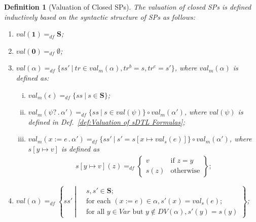 \documentclass{fcs}
\newtheorem{mydef}{Definition}[section]
\newcommand{\bff}[1]{\mathbf{#1}}
\newcommand{\sig}[0]{\varsigma}
\newcommand{\noth}[0]{\mathbf{1}}
\newcommand{\halt}[0]{\mathbf{0}}
\newcommand{\true}[0]{\mathit{tt}}
\newcommand{\false}[0]{\mathit{ff}}
\newcommand{\Var}[0]{\mathit{Var}}
\newcommand{\val}[0]{\mathit{val}}
\newcommand{\dVar}[0]{\mathit{DV}} %
\DeclareMathOperator{\nex}{.}
\newcommand{\mval}[0]{\mathit{val}_m}
\newcommand{\dddef}[0]{=_{df}}
\begin{document}
\begin{mydef}[Valuation of Closed SPs]
	\label{def:Valuation of Closed SPs}
	The valuation of closed SPs is defined inductively based on the syntactic structure of SPs as follows:
	\begin{enumerate}
		\item $\val(\noth)\dddef \bff{S}$;
		\item $\val(\halt)\dddef \emptyset$;
		\item $\val(\alpha)\dddef \{ss'\ |\ tr\in \mval(\alpha), tr^b = s, tr^e = s'\}$, where $\mval(\alpha)$ is defined as:
		\begin{enumerate}[(i)]
		    \item $\mval(\epsilon)\dddef \{ss\ |\ s\in \bff{S}\}$;
		    \item $\mval(\psi?\nex \alpha')\dddef \{ss\ |\ s\in \val(\psi)\}\circ \mval(\alpha')$, where $\val(\psi)$ is defined in Def.~\ref{def:Valuation of sDTL Formulas};
		    \item $\mval(x:=e\nex \alpha')\dddef \{ss'\ |\ s' = s[x\mapsto \val_s(e)]\}\circ \mval(\alpha')$, where $s[y\mapsto v]$ is defined as
            $$
            \begin{aligned}
            s[y\mapsto v](z)\dddef \left\{
            \begin{array}{ll}
            v & \mbox{if $z = y$}\\
            s(z) & \mbox{otherwise}
            \end{array}
            \right\};
            \end{aligned}
            $$
		\end{enumerate}
		\ifx
		\item $\val(\alpha)\dddef \left\{ss'\ \left|\ \begin{aligned}&s, s'\in \bff{S}; \\
					&\mbox{for each } (x:=e)\in \alpha, s'(x)=\val_s(e);\\
					&\mbox{for all }y\in \Var\mbox{ but }y\notin \dVar(\alpha),  s'(y)=s(y)\end{aligned}\right.\right\}$;

\end{enumerate}
\end{mydef}
\end{document}
